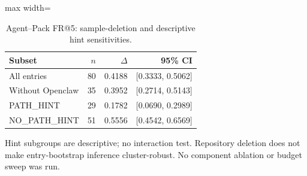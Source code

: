 \begin{table}[t]
\centering
\caption{Agent--Pack FR@5: sample-deletion and descriptive hint sensitivities.}\label{tab:robustness}
\small
\begin{adjustbox}{max width=\columnwidth}\begin{tabular}{lrrr}
\toprule
Subset & $n$ & $\Delta$ & 95\% CI \\
\midrule
All entries & 80 & 0.4188 & [0.3333, 0.5062] \\
Without Openclaw & 35 & 0.3952 & [0.2714, 0.5143] \\
PATH\_HINT & 29 & 0.1782 & [0.0690, 0.2989] \\
NO\_PATH\_HINT & 51 & 0.5556 & [0.4542, 0.6569] \\
\bottomrule
\end{tabular}\end{adjustbox}
\par\vspace{2pt}\begin{minipage}{\columnwidth}\footnotesize Hint subgroups are descriptive; no interaction test. Repository deletion does not make entry-bootstrap inference cluster-robust. No component ablation or budget sweep was run.\end{minipage}
\end{table}
